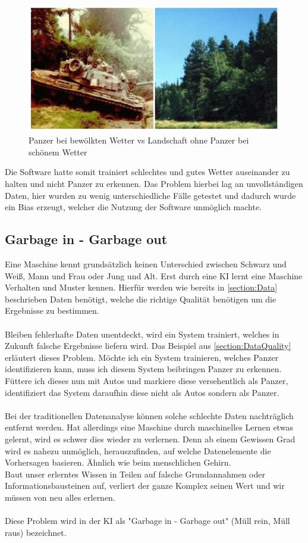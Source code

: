 \documentclass[12pt,oneside,a4paper,parskip]{scrbook}
\begin{document}
\begin{figure}[h]
	\begin{center}
		\includegraphics[width=15cm]{Bilder/tank.png}
		\caption{Panzer bei bewölkten Wetter vs Landschaft ohne Panzer bei schönem Wetter}
		\label{fig:tank}
	\end{center}
\end{figure}
Die Software hatte somit trainiert schlechtes und gutes Wetter auseinander zu halten und nicht Panzer zu erkennen. Das Problem hierbei lag an unvollständigen Daten, hier wurden zu wenig unterschiedliche Fälle getestet und dadurch wurde ein Bias erzeugt, welcher die Nutzung der Software unmöglich machte.

\subsection{Garbage in - Garbage out}
\label{section:DataGarbage}
Eine Maschine kennt grundsätzlich keinen Unterschied zwischen Schwarz und Weiß, Mann und Frau oder Jung und Alt. Erst durch eine KI lernt eine Maschine Verhalten und Muster kennen. Hierfür werden wie bereits in \ref{section:Data} beschrieben Daten benötigt, welche die richtige Qualität benötigen um die Ergebnisse zu bestimmen.
\\\\
Bleiben fehlerhafte Daten unentdeckt, wird ein System trainiert, welches in Zukunft falsche Ergebnisse liefern wird. Das Beispiel aus \ref{section:DataQuality} erläutert dieses Problem. Möchte ich ein System trainieren, welches Panzer identifizieren kann, muss ich diesem System beibringen Panzer zu erkennen. Füttere ich dieses nun mit Autos und markiere diese versehentlich als Panzer, identifiziert das System daraufhin diese nicht als Autos sondern als Panzer.
\\\\
Bei der traditionellen  Datenanalyse können solche schlechte Daten nachträglich entfernt werden. Hat allerdings eine Maschine durch maschinelles Lernen etwas gelernt, wird es schwer dies wieder zu verlernen. Denn ab einem Gewissen Grad wird es nahezu unmöglich, herauszufinden, auf welche Datenelemente die Vorhersagen basieren. Ähnlich wie beim menschlichen Gehirn.\\
Baut unser erlerntes Wissen in Teilen auf falsche Grundannahmen oder Informationsbausteinen auf, verliert der ganze Komplex seinen Wert und wir müssen von neu alles erlernen.
\\\\
Diese Problem wird in der KI als "Garbage in - Garbage out" (Müll rein, Müll raus) bezeichnet.
\end{document}
